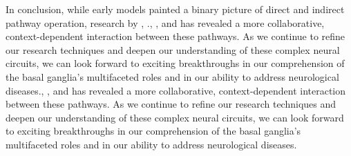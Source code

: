\documentclass[10pt]{article}
\begin{document}
\begin{sloppypar}
  In conclusion, while early models painted a binary picture of direct and indirect pathway operation, research by \citeauthor{cui_concurrent_2013}, \citeauthor{guillaumin_experimental_2021}., \citeauthor{hilt_evidence_2016}, and \citeauthor{wang_direct_2015} has revealed a more collaborative, context-dependent interaction between these pathways. As we continue to refine our research techniques and deepen our understanding of these complex neural circuits, we can look forward to exciting breakthroughs in our comprehension of the basal ganglia’s multifaceted roles and in our ability to address neurological diseases., \citeauthor{hilt_evidence_2016}, and \citeauthor{wang_direct_2015} has revealed a more collaborative, context-dependent interaction between these pathways. As we continue to refine our research techniques and deepen our understanding of these complex neural circuits, we can look forward to exciting breakthroughs in our comprehension of the basal ganglia’s multifaceted roles and in our ability to address neurological diseases.

  \pagebreak
  \singlespacing %
  
  

\end{sloppypar}
\end{document}
